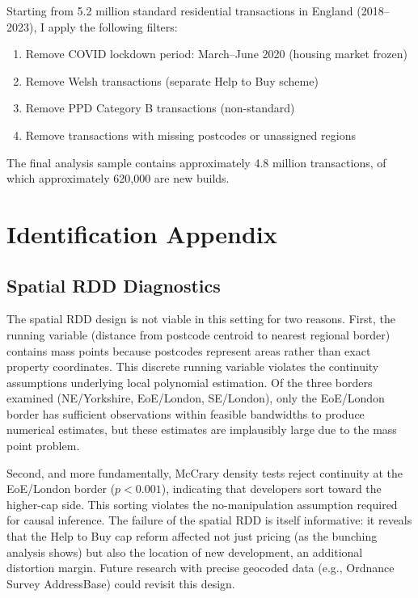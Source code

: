 \documentclass[12pt]{article}
\begin{document}
Starting from 5.2 million standard residential transactions in England (2018--2023), I apply the following filters:

\begin{enumerate}
\item Remove COVID lockdown period: March--June 2020 (housing market frozen)
\item Remove Welsh transactions (separate Help to Buy scheme)
\item Remove PPD Category B transactions (non-standard)
\item Remove transactions with missing postcodes or unassigned regions
\end{enumerate}

The final analysis sample contains approximately 4.8 million transactions, of which approximately 620,000 are new builds.

\section{Identification Appendix}\label{app:identification}

\subsection{Spatial RDD Diagnostics}

The spatial RDD design is not viable in this setting for two reasons. First, the running variable (distance from postcode centroid to nearest regional border) contains mass points because postcodes represent areas rather than exact property coordinates. This discrete running variable violates the continuity assumptions underlying local polynomial estimation. Of the three borders examined (NE/Yorkshire, EoE/London, SE/London), only the EoE/London border has sufficient observations within feasible bandwidths to produce numerical estimates, but these estimates are implausibly large due to the mass point problem.

Second, and more fundamentally, McCrary density tests reject continuity at the EoE/London border ($p < 0.001$), indicating that developers sort toward the higher-cap side. This sorting violates the no-manipulation assumption required for causal inference. The failure of the spatial RDD is itself informative: it reveals that the Help to Buy cap reform affected not just pricing (as the bunching analysis shows) but also the location of new development, an additional distortion margin. Future research with precise geocoded data (e.g., Ordnance Survey AddressBase) could revisit this design.
\end{document}
